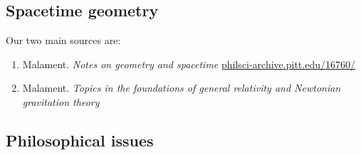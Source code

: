 \documentclass[11pt]{article}
\begin{document}

\subsection*{Spacetime geometry}

Our two main sources are:
\begin{enumerate}
\item Malament. \emph{Notes on geometry and spacetime}
  \url{philsci-archive.pitt.edu/16760/}
\item Malament. \textit{Topics in the foundations of general
    relativity and Newtonian gravitation theory}
\end{enumerate}


\subsection*{Philosophical issues}
\end{document}
